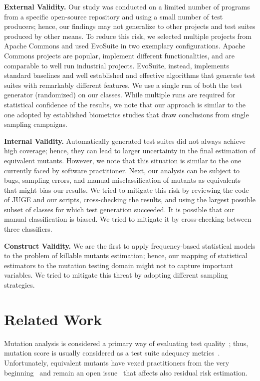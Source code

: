 \documentclass[sigconf]{acmart}
\begin{document}
\noindent\textbf{External Validity.}
Our study was conducted on a limited number of programs from a specific
open-source repository and using a small number of test producers;
hence, our findings
may not generalize to other projects and test suites produced by other means.
To reduce this risk, we selected multiple projects from Apache Commons and
used EvoSuite in two exemplary configurations.
Apache Commons projects are popular, implement different functionalities, and
are comparable to %
well run industrial projects.
EvoSuite, instead, implements standard baselines %
and
well established and effective algorithms %
that generate test suites with remarkably different features.
We use a single run of both the test generator (randomized) on our classes.
While multiple runs are required for statistical confidence of the results,
we note that our approach is similar to the one adopted by established biometrics
studies that draw conclusions from single sampling campaigns.

\noindent\textbf{Internal Validity.}
Automatically generated test suites did not always achieve high coverage;
hence, they can lead to larger uncertainty in the final estimation of equivalent mutants. 
However, we note that this situation is similar to the one currently faced by software practitioner. %
Next, our analysis can be subject to bugs, sampling errors, and manual-misclassification of mutants 
as equivalents
that might bias our results.
We tried to mitigate this risk by reviewing the code of JUGE and our scripts, 
cross-checking the results, and using the largest possible subset of classes for which
test generation succeeded.
It is possible that our manual classification is biased. We tried to mitigate it by cross-checking between three classifiers.

\noindent\textbf{Construct Validity.} We are the first to apply
frequency-based statistical models %
to the problem of killable mutants estimation; hence, 
our mapping of statistical estimators to the mutation testing domain
might not to capture important variables. %
We tried to mitigate this threat by adopting different sampling strategies.

\section{Related Work}
\label{sec:related}
Mutation analysis is considered a primary way of evaluating test quality~\cite{papadakis2019mutation};
thus, mutation score is usually considered as a test suite adequacy metrics~\cite{just2014are,andrews2005is,andrews2006using,daran1996software}. 
Unfortunately, equivalent mutants have vexed practitioners from the very beginning~\cite{budd1982two}
and remain an open issue~\cite{madeyski2014overcoming} that affects also residual risk estimation.
\end{document}
